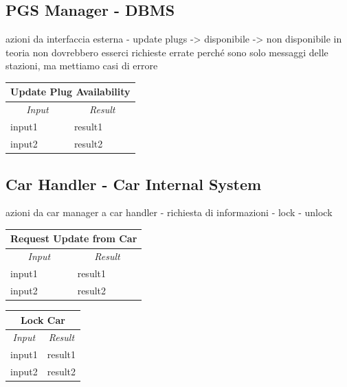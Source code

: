 \documentclass[english]{article}
\begin{document}
\subsection{PGS Manager - DBMS}
azioni da interfaccia esterna
- update plugs
	-> disponibile
	-> non disponibile
in teoria non dovrebbero esserci richieste errate perché sono solo messaggi delle stazioni, ma mettiamo casi di errore

\begin{center}
	\begin{tabular}{ | m{6cm} | m{6cm} | }
		\hline
		\multicolumn{2}{|c|}{\textbf{Update Plug Availability}} \\
		\hline
		\multicolumn{1}{|c|}{\textit{Input}} & \multicolumn{1}{c|}{\textit{Result}} \\
		\hline
		input1 & result1 \\
		\hline
		input2 & result2 \\
		\hline
	\end{tabular}
\end{center}

\subsection{Car Handler - Car Internal System}
azioni da car manager a car handler
- richiesta di informazioni
- lock
- unlock

\begin{center}
	\begin{tabular}{ | m{6cm} | m{6cm} | }
		\hline
		\multicolumn{2}{|c|}{\textbf{Request Update from Car}} \\
		\hline
		\multicolumn{1}{|c|}{\textit{Input}} & \multicolumn{1}{c|}{\textit{Result}} \\
		\hline
		input1 & result1 \\
		\hline
		input2 & result2 \\
		\hline
	\end{tabular}
\end{center}

\begin{center}
	\begin{tabular}{ | m{6cm} | m{6cm} | }
		\hline
		\multicolumn{2}{|c|}{\textbf{Lock Car}} \\
		\hline
		\multicolumn{1}{|c|}{\textit{Input}} & \multicolumn{1}{c|}{\textit{Result}} \\
		\hline
		input1 & result1 \\
		\hline
		input2 & result2 \\
		\hline
	\end{tabular}
\end{center}
\end{document}
